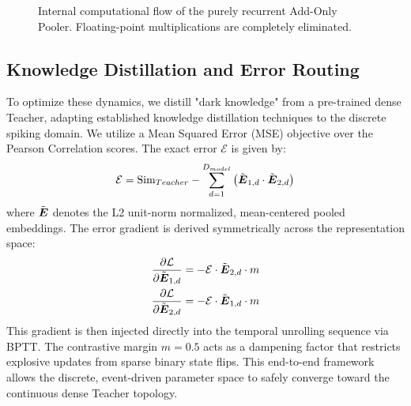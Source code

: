 \documentclass[final]{clv2025}
\begin{document}
\begin{figure}[t!]
\begin{center}
{%
}
\end{center}
\caption{Internal computational flow of the purely recurrent Add-Only Pooler. Floating-point multiplications are completely eliminated.}
\label{fig:pooler_mech}
\end{figure}


\subsection{Knowledge Distillation and Error Routing}
To optimize these dynamics, we distill "dark knowledge" from a pre-trained dense Teacher, adapting established knowledge distillation techniques \citep{hinton2015distilling} to the discrete spiking domain. We utilize a Mean Squared Error (MSE) objective over the Pearson Correlation scores. The exact error $\mathcal{E}$ is given by:
\begin{equation}
\mathcal{E} = \text{Sim}_{Teacher} - \sum_{d=1}^{D_{model}} \left(\tilde{\boldsymbol{E}}_{1,d} \cdot \tilde{\boldsymbol{E}}_{2,d}\right)
\end{equation}
where $\tilde{\boldsymbol{E}}$ denotes the L2 unit-norm normalized, mean-centered pooled embeddings. The error gradient is derived symmetrically across the representation space:
\begin{align}
\frac{\partial \mathcal{L}}{\partial \tilde{\boldsymbol{E}}_{1,d}} &= -\mathcal{E} \cdot \tilde{\boldsymbol{E}}_{2,d} \cdot m \\
\frac{\partial \mathcal{L}}{\partial \tilde{\boldsymbol{E}}_{2,d}} &= -\mathcal{E} \cdot \tilde{\boldsymbol{E}}_{1,d} \cdot m
\end{align}
This gradient is then injected directly into the temporal unrolling sequence via BPTT. The contrastive margin $m=0.5$ acts as a dampening factor that restricts explosive updates from sparse binary state flips. This end-to-end framework allows the discrete, event-driven parameter space to safely converge toward the continuous dense Teacher topology.
\end{document}
